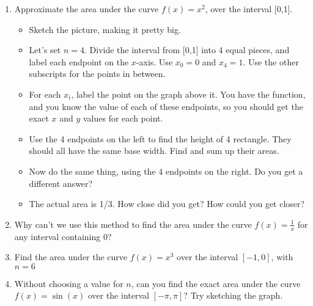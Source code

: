 \documentclass{article}
\begin{document}
\begin{enumerate}
\item Approximate the area under the curve $f(x) = x^2$, over the interval [0,1].
\begin{itemize}
\item Sketch the picture, making it pretty big.
\item Let's set $n=4$. Divide the interval from [0,1] into 4 equal pieces, and label each endpoint on the $x$-axis. Use $x_0 = 0$ and $x_4 = 1$. Use the other subscripts for the points in between.
\item For each $x_i$, label the point on the graph above it. You have the function, and you know the value of each of these endpoints, so you should get the exact $x$ and $y$ values for each point.
\item Use the 4 endpoints on the left to find the height of 4 rectangle. They should all have the same base width. Find and sum up their areas.
\item Now do the same thing, using the 4 endpoints on the right. Do you get a different answer?
\item The actual area is 1/3. How close did you get? How could you get closer?
\end{itemize}
\item Why can't we use this method to find the area under the curve $f(x) = \frac{1}{x}$ for any interval containing 0?
\item Find the area under the curve $f(x) = x^3$ over the interval $[-1,0]$, with $n=6$
\item Without choosing a value for $n$, can you find the exact area under the curve $f(x) = \sin(x)$ over the interval $[-\pi,\pi]$? Try sketching the graph.
\end{enumerate}
\end{document}
